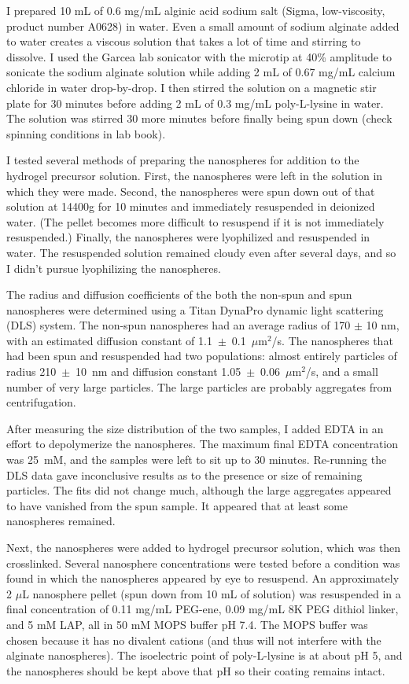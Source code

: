 I prepared 10 mL of 0.6 mg/mL alginic acid sodium salt (Sigma, low-viscosity, product number A0628) in water.  Even a small amount of sodium alginate added to water creates a viscous solution that takes a lot of time and stirring to dissolve.  I used the Garcea lab sonicator with the microtip at 40\% amplitude to sonicate the sodium alginate solution while adding 2 mL of 0.67 mg/mL calcium chloride in water drop-by-drop.  I then stirred the solution on a magnetic stir plate for 30 minutes before adding 2 mL of 0.3 mg/mL poly-L-lysine in water.  The solution was stirred 30 more minutes before finally being spun down (check spinning conditions in lab book).

I tested several methods of preparing the nanospheres for addition to the hydrogel precursor solution.  First, the nanospheres were left in the solution in which they were made.  Second, the nanospheres were spun down out of that solution at 14400g for 10 minutes and immediately resuspended in deionized water.  (The pellet becomes more difficult to resuspend if it is not immediately resuspended.) Finally, the nanospheres were lyophilized and resuspended in water.  The resuspended solution remained cloudy even after several days, and so I didn't pursue lyophilizing the nanospheres.

The radius and diffusion coefficients of the both the non-spun and spun nanospheres were determined using a Titan DynaPro dynamic light scattering (DLS) system.  The non-spun nanospheres had an average radius of 170 $\pm$ 10 nm, with an estimated diffusion constant of 1.1~$\pm$~0.1~$\mu$m$^2$/s.  The nanospheres that had been spun and resuspended had two populations: almost entirely particles of radius 210~$\pm$~10~nm and diffusion constant 1.05~$\pm$~0.06~$\mu$m$^2$/s, and a small number of very large particles.  The large particles are probably aggregates from centrifugation.

After measuring the size distribution of the two samples, I added EDTA in an effort to depolymerize the nanospheres.  The maximum final EDTA concentration was 25~mM, and the samples were left to sit up to 30 minutes.  Re-running the DLS data gave inconclusive results as to the presence or size of remaining particles.  The fits did not change much, although the large aggregates appeared to have vanished from the spun sample.  It appeared that at least some nanospheres remained.

Next, the nanospheres were added to hydrogel precursor solution, which was then crosslinked.  Several nanosphere concentrations were tested before a condition was found in which the nanospheres appeared by eye to resuspend.  An approximately 2 $\mu$L nanosphere pellet (spun down from 10 mL of solution) was resuspended in a final concentration of 0.11 mg/mL PEG-ene, 0.09 mg/mL 8K PEG dithiol linker, and 5 mM LAP, all in 50 mM MOPS buffer pH 7.4.  The MOPS buffer was chosen because it has no divalent cations (and thus will not interfere with the alginate nanospheres).  The isoelectric point of poly-L-lysine is at about pH 5, and the nanospheres should be kept above that pH so their coating remains intact.

